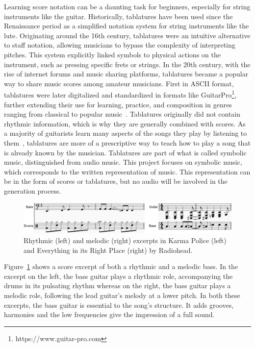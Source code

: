 Learning score notation can be a daunting task for beginners, especially for string instruments like the guitar.
Historically, tablatures have been used since the Renaissance period as a simplified notation system for string instruments like the lute.
Originating around the 16th century, tablatures were an intuitive alternative to staff notation, allowing musicians to bypass the complexity of interpreting pitches.
This system explicitly linked symbols to physical actions on the instrument, such as pressing specific frets or strings.
In the 20th century, with the rise of internet forums and music sharing platforms, tablatures became a popular way to share music scores among amateur musicians.
First in ASCII format, tablatures were later digitalized and standardized in formats like GuitarPro\footnote{https://www.guitar-pro.com}, further extending their use for learning, practice, and composition in genres ranging from classical to popular music~\cite{sarmento_dadagp_2021}.
Tablatures originally did not contain rhythmic information, which is why they are generally combined with scores.
As a majority of guitarists learn many aspects of the songs they play by listening to them~\cite{green_how_2001},
tablatures are more of a prescriptive way to teach how to play a song that is already known by the musician.
Tablatures are part of what is called symbolic music, distinguished from audio music.
This project focuses on symbolic music, which corresponds to the written representation of music.
This representation can be in the form of scores or tablatures, but no audio will be involved in the generation process.


\begin{figure}[!ht]
    \includegraphics[width=.9\linewidth]{../images-figures/rhythmic_melodic.png}
    \caption{Rhythmic (left) and melodic (right) excerpts in Karma Police (left) and Everything in its Right Place (right) by Radiohead.}
    \label{fig:bass_tab_TIRO}
\end{figure}


Figure~\ref{fig:bass_tab_TIRO} shows a score excerpt of both a rhythmic and a melodic bass.
In the excerpt on the left, the bass guitar plays a rhythmic role, accompanying the drums in its pulsating rhythm 
whereas on the right, the bass guitar plays a melodic role, following the lead guitar's melody at a lower pitch.
In both these excerpts, the bass guitar is essential to the song's structure.
It adds grooves, harmonies and the low frequencies give the impression of a full sound.


